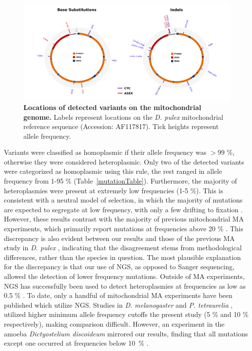 \documentclass[12pt,twoside]{reedthesis}
\begin{document}
\begin{figure}
    \begin{center}
        \includegraphics[width=1\textwidth]{../figures/var_circos.png}
    \end{center}
    \caption[Locations of detected variants on the mitochondrial genome]{\textbf{Locations of detected variants on the mitochondrial genome.} Labels represent locations on the \textit{D. pulex} mitochondrial reference sequence (Accession: AF117817). Tick heights represent allele frequency.}
    \label{circ_mutations}
\end{figure}

Variants were classified as homoplasmic if their allele frequency was $>$99 \%, otherwise they were considered heteroplasmic.
Only two of the detected variants were categorized as homoplasmic using this rule, the rest ranged in allele frequency from 1-95 \% (\mbox{Table \ref{mutationTable}}).
Furthermore, the majority of heteroplasmies were present at extremely low frequencies (1-5 \%).
This is consistent with a neutral model of selection, in which the majority of mutations are expected to segregate at low frequency, with only a few drifting to fixation \citep{kimura_neutral_1983}.
However, these results contrast with the majority of previous mitochondrial \gls{MA} experiments, which primarily report mutations at frequencies above 20 \% \citep{denver_high_2000, haag-liautard_direct_2008, howe_high_2010, molnar_mutation_2011, xu_high_2012}.
This discrepancy is also evident between our results and those of the previous \gls{MA} study in \textit{D. pulex} \citep{xu_high_2012}, indicating that the disagreement stems from methodological differences, rather than the species in question.
The most plausible explanation for the discrepancy is that our use of \gls{NGS}, as opposed to Sanger sequencing, allowed the detection of lower frequency mutations.
Outside of \gls{MA} experiments, \gls{NGS} has successfully been used to detect heteroplasmies at frequencies as low as 0.5 \% \citep{guo_use_2012, li_extensive_2015}.
To date, only a handful of mitochondrial \gls{MA} experiments have been published which utilize \gls{NGS}.
Studies in \textit{D. melanogaster} \citep{keightley_analysis_2009} and \textit{P. tetraurelia} \citep{sung_extraordinary_2012}, utilized higher minimum allele frequency cutoffs the present study (5 \% and 10 \% respectively), making comparison difficult. 
However, an experiment in the amoeba \textit{Dictyostelium discoideum} mirrored our results, finding that all mutations except one occurred at frequencies below \mbox{10 \%} \citep{saxer_whole_2012}.
\end{document}
